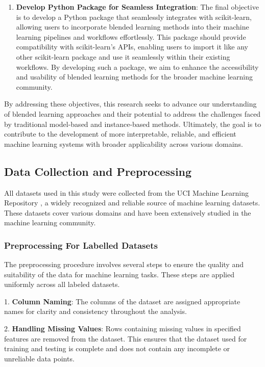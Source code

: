\documentclass[a4paper, 12pt]{report}
\begin{document}
\begin{enumerate}
    \item \textbf{Develop Python Package for Seamless Integration}: 
    The final objective is to develop a Python package that seamlessly integrates with scikit-learn, allowing users to incorporate blended learning methods into their machine learning pipelines and workflows effortlessly. 
    This package should provide compatibility with scikit-learn's APIs, enabling users to import it like any other scikit-learn package and use it seamlessly within their existing workflows. 
    By developing such a package, we aim to enhance the accessibility and usability of blended learning methods for the broader machine learning community.
\end{enumerate}

By addressing these objectives, this research seeks to advance our understanding of blended learning approaches and their potential to address the challenges faced by 
traditional model-based and instance-based methods. Ultimately, the goal is to contribute to the development of more interpretable, reliable, and efficient machine learning 
systems with broader applicability across various domains.

\subsection{Data Collection and Preprocessing}
All datasets used in this study were collected from the UCI Machine Learning Repository \cite{uciRepository}, a widely recognized and reliable source of machine learning datasets. 
These datasets cover various domains and have been extensively studied in the machine learning community.

\subsubsection{Preprocessing For Labelled Datasets}
The preprocessing procedure involves several steps to ensure the quality and suitability of the data for machine learning tasks. These steps are applied uniformly across all labeled datasets.

1. \textbf{Column Naming}: The columns of the dataset are assigned appropriate names for clarity and consistency throughout the analysis.

2. \textbf{Handling Missing Values}: Rows containing missing values in specified features are removed from the dataset. 
This ensures that the dataset used for training and testing is complete and does not contain any incomplete or unreliable data points.
\end{document}
